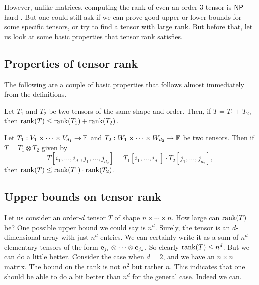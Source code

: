 However, unlike matrices, computing the rank of even an order-$3$ tensor is $\mathsf{NP}$-hard \cite{h90}.
But one could still ask if we can prove good upper or lower bounds for some specific tensors, or try to find a tensor with large rank.
But before that, let us look at some basic properties that tensor rank satisfies.

\subsection*{Properties of  tensor rank}

The following are a couple of basic properties that follows almost immediately from the definitions.

\begin{lemma}\label{lem:tensor-subadditivity}
  Let $T_1$ and $T_2$ be two tensors of the same shape and order.
Then, if $T = T_1 + T_2$, then $\operatorname{rank}(T) \leq \operatorname{rank}(T_1) + \operatorname{rank}(T_2)$.
\end{lemma}

\begin{lemma}\label{lem:tensor-submultiplicativity}
  Let $T_1: V_1 \times \cdots \times V_{d_1} \rightarrow \mathbb{F}$ and $T_2: W_1 \times \cdots \times W_{d_2} \rightarrow \mathbb{F}$ be two tensors.
Then if $T = T_1 \otimes T_2$ given by
\[
T[i_1,\ldots, i_{d_1},j_1,\ldots, j_{d_2}] = T_1[i_1,\ldots, i_{d_1}] \cdot T_2[j_1,\ldots, j_{d_2}],
\]
then $\operatorname{rank}(T) \leq \operatorname{rank}(T_1) \cdot \operatorname{rank}(T_2)$. 
\end{lemma}


\subsection{Upper bounds on tensor rank}

Let us consider an order-$d$ tensor $T$ of shape $n \times \cdots \times n$.
How large can $\operatorname{rank}(T)$ be?
One possible upper bound we could say is $n^d$.
Surely, the tensor is an $d$-dimensional array with just $n^d$ entries.
We can certainly write it as a sum of $n^d$ elementary tensors of the form $\mathbf{e}_{j_1} \otimes \cdots \otimes \mathbf{e}_{j_d}$.
So clearly $\operatorname{rank}(T) \leq n^d$.
But we can do a little better.
Consider the case when $d=2$, and we have an $n\times n$ matrix.
The bound on the rank is not $n^2$ but rather $n$.
This indicates that one should be able to do a bit better than $n^d$ for the general case.
Indeed we can.

